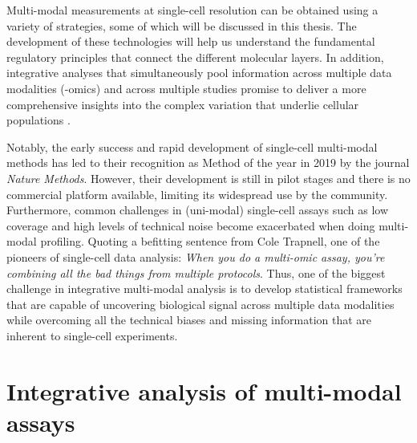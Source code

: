 Multi-modal measurements at single-cell resolution can be obtained using a variety of strategies, some of which will be discussed in this thesis. The development of these technologies will help us understand the fundamental regulatory principles that connect the different molecular layers. In addition, integrative analyses that simultaneously pool information across multiple data modalities (-omics) and across multiple studies promise to deliver a more comprehensive insights into the complex variation that underlie cellular populations \cite{Stuart2019,Colome-Tatche2018}.

Notably, the early success and rapid development of single-cell multi-modal methods has led to their recognition as Method of the year in 2019 by the journal \textit{Nature Methods}\cite{NatMethods2020}. However, their development is still in pilot stages and there is no commercial platform available, limiting its widespread use by the community. Furthermore, common challenges in (uni-modal) single-cell assays such as low coverage and high levels of technical noise become exacerbated when doing multi-modal profiling. Quoting a befitting sentence from Cole Trapnell, one of the pioneers of single-cell data analysis: \textit{When you do a multi-omic assay, you're combining all the bad things from multiple protocols}\cite{Eisenstein2020}. Thus, one of the biggest challenge in integrative multi-modal analysis is to develop statistical frameworks that are capable of uncovering biological signal across multiple data modalities while overcoming all the technical biases and missing information that are inherent to single-cell experiments. 


\section{Integrative analysis of multi-modal assays}

